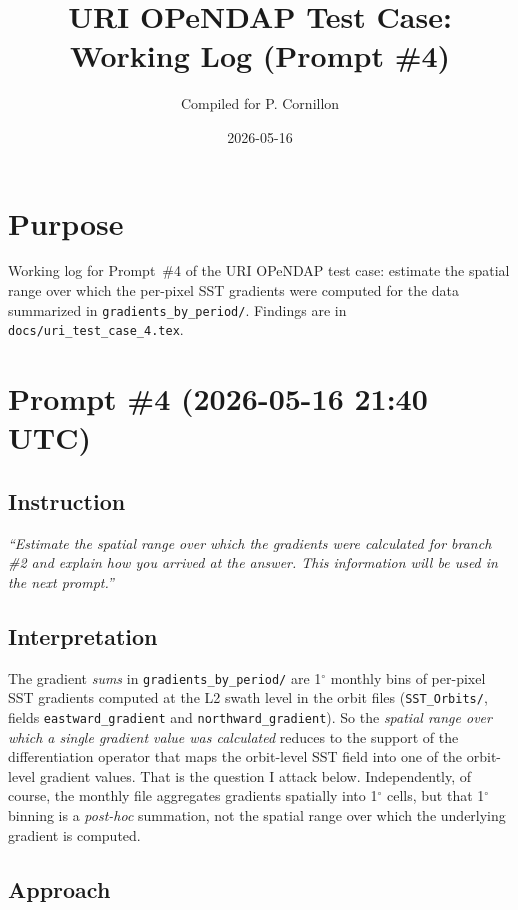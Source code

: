 \documentclass[11pt]{article}
\title{URI OPeNDAP Test Case: Working Log (Prompt \#4)}
\author{Compiled for P. Cornillon}
\date{2026-05-16}
\begin{document}
\maketitle

\section*{Purpose}

Working log for Prompt~\#4 of the URI OPeNDAP test case: estimate
the spatial range over which the per-pixel SST gradients were
computed for the data summarized in
\texttt{gradients\_by\_period/}. Findings are in
\texttt{docs/uri\_test\_case\_4.tex}.

\section{Prompt \#4 (2026-05-16 21:40 UTC)}

\subsection{Instruction}

\emph{``Estimate the spatial range over which the gradients were
calculated for branch \#2 and explain how you arrived at the
answer. This information will be used in the next prompt.''}

\subsection{Interpretation}

The gradient \emph{sums} in \texttt{gradients\_by\_period/} are
1$^\circ$ monthly bins of per-pixel SST gradients computed at the
L2 swath level in the orbit files
(\texttt{SST\_Orbits/}, fields \texttt{eastward\_gradient} and
\texttt{northward\_gradient}). So the \emph{spatial range over
which a single gradient value was calculated} reduces to the
support of the differentiation operator that maps the orbit-level
SST field into one of the orbit-level gradient values. That is
the question I attack below. Independently, of course, the
monthly file aggregates gradients spatially into 1$^\circ$ cells,
but that 1$^\circ$ binning is a \emph{post-hoc} summation, not the
spatial range over which the underlying gradient is computed.

\subsection{Approach}
\end{document}
